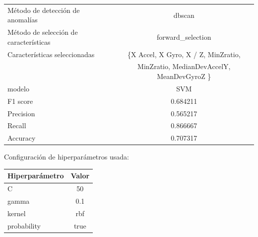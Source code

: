 \begin{appendices}
\begin{table}[htb]
			\begin{tabular}{lc}
				\toprule
				\midrule
					  Método de detección de anomalías &                                             dbscan \\
				Método de selección de características &                                  forward\_selection \\
						 Características seleccionadas & \{X Accel, X Gyro, X / Z, MinZratio,   \\
						 							   &  MinZratio, MedianDevAccelY, MeanDevGyroZ \} \\
												modelo &                                                SVM \\
											  F1 score &                                           0.684211 \\
											 Precision &                                           0.565217 \\
												Recall &                                           0.866667 \\
											  Accuracy &                                           0.707317 \\
				\bottomrule
			\end{tabular}
			\newline
			\newline
			Configuración de hiperparámetros usada:
			\begin{tabular}{lc}
				\toprule
				Hiperparámetro & Valor \\
				\midrule
							 C &    50 \\
						 gamma &   0.1 \\
						kernel &   rbf \\
				   probability &  true \\
				\bottomrule
			\end{tabular}
			
		\end{table}


\end{appendices}
